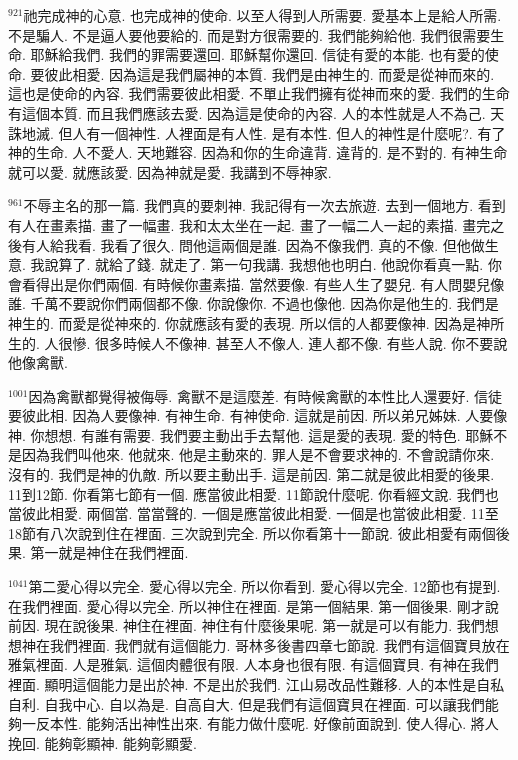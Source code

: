 \documentclass{book}
\begin{document}
$^{921}$祂完成神的心意.
也完成神的使命.
以至人得到人所需要.
愛基本上是給人所需.
不是騙人.
不是逼人要他要給的.
而是對方很需要的.
我們能夠給他.
我們很需要生命.
耶穌給我們.
我們的罪需要還回.
耶穌幫你還回.
信徒有愛的本能.
也有愛的使命.
要彼此相愛.
因為這是我們屬神的本質.
我們是由神生的.
而愛是從神而來的.
這也是使命的內容.
我們需要彼此相愛.
不單止我們擁有從神而來的愛.
我們的生命有這個本質.
而且我們應該去愛.
因為這是使命的內容.
人的本性就是人不為己.
天誅地滅.
但人有一個神性.
人裡面是有人性.
是有本性.
但人的神性是什麼呢?.
有了神的生命.
人不愛人.
天地難容.
因為和你的生命違背.
違背的.
是不對的.
有神生命就可以愛.
就應該愛.
因為神就是愛.
我講到不辱神家.

$^{961}$不辱主名的那一篇.
我們真的要刺神.
我記得有一次去旅遊.
去到一個地方.
看到有人在畫素描.
畫了一幅畫.
我和太太坐在一起.
畫了一幅二人一起的素描.
畫完之後有人給我看.
我看了很久.
問他這兩個是誰.
因為不像我們.
真的不像.
但他做生意.
我說算了.
就給了錢.
就走了.
第一句我講.
我想他也明白.
他說你看真一點.
你會看得出是你們兩個.
有時候你畫素描.
當然要像.
有些人生了嬰兒.
有人問嬰兒像誰.
千萬不要說你們兩個都不像.
你說像你.
不過也像他.
因為你是他生的.
我們是神生的.
而愛是從神來的.
你就應該有愛的表現.
所以信的人都要像神.
因為是神所生的.
人很慘.
很多時候人不像神.
甚至人不像人.
連人都不像.
有些人說.
你不要說他像禽獸.

$^{1001}$因為禽獸都覺得被侮辱.
禽獸不是這麼差.
有時候禽獸的本性比人還要好.
信徒要彼此相.
因為人要像神.
有神生命.
有神使命.
這就是前因.
所以弟兄姊妹.
人要像神.
你想想.
有誰有需要.
我們要主動出手去幫他.
這是愛的表現.
愛的特色.
耶穌不是因為我們叫他來.
他就來.
他是主動來的.
罪人是不會要求神的.
不會說請你來.
沒有的.
我們是神的仇敵.
所以要主動出手.
這是前因.
第二就是彼此相愛的後果.
11到12節.
你看第七節有一個.
應當彼此相愛.
11節說什麼呢.
你看經文說.
我們也當彼此相愛.
兩個當.
當當聲的.
一個是應當彼此相愛.
一個是也當彼此相愛.
11至18節有八次說到住在裡面.
三次說到完全.
所以你看第十一節說.
彼此相愛有兩個後果.
第一就是神住在我們裡面.

$^{1041}$第二愛心得以完全.
愛心得以完全.
所以你看到.
愛心得以完全.
12節也有提到.
在我們裡面.
愛心得以完全.
所以神住在裡面.
是第一個結果.
第一個後果.
剛才說前因.
現在說後果.
神住在裡面.
神住有什麼後果呢.
第一就是可以有能力.
我們想想神在我們裡面.
我們就有這個能力.
哥林多後書四章七節說.
我們有這個寶貝放在雅氣裡面.
人是雅氣.
這個肉體很有限.
人本身也很有限.
有這個寶貝.
有神在我們裡面.
顯明這個能力是出於神.
不是出於我們.
江山易改品性難移.
人的本性是自私自利.
自我中心.
自以為是.
自高自大.
但是我們有這個寶貝在裡面.
可以讓我們能夠一反本性.
能夠活出神性出來.
有能力做什麼呢.
好像前面說到.
使人得心.
將人挽回.
能夠彰顯神.
能夠彰顯愛.
\end{document}
